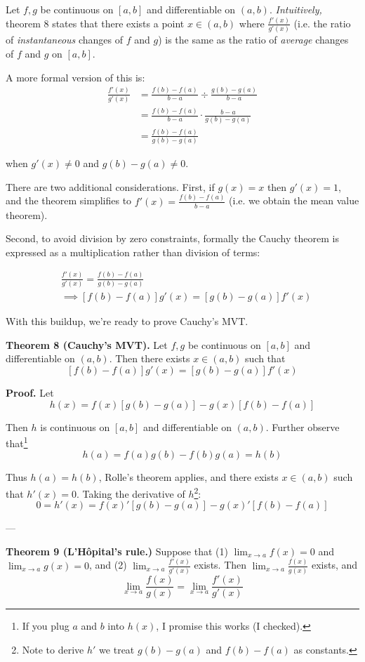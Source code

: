 \vs

Let $f,g$ be continuous on $[a,b]$ and differentiable on $(a,b)$.
\textit{Intuitively,} theorem 8 states that there exists a point
$x\in(a,b)$ where $\frac{f'(x)}{g'(x)}$ (i.e. the ratio of
\textit{instantaneous} changes of $f$ and $g$) is the same as the
ratio of \textit{average} changes of $f$ and $g$ on $[a,b]$.

\vs

A more formal version of this is:
\begin{align*}
  \frac{f'(x)}{g'(x)}&=\frac{f(b)-f(a)}{b-a}\div \frac{g(b)-g(a)}{b-a}\\
                     &=\frac{f(b)-f(a)}{b-a}\cdot \frac{b-a}{g(b)-g(a)}\\
                     &=\frac{f(b)-f(a)}{g(b)-g(a)}
\end{align*}

when $g'(x)\neq 0$ and $g(b)-g(a)\neq0$.

\vs

There are two additional considerations. First, if $g(x)=x$ then
$g'(x)=1$, and the theorem simplifies to $f'(x)=\frac{f(b)-f(a)}{b-a}$
(i.e. we obtain the mean value theorem).

\vs

Second, to avoid division by zero constraints, formally the Cauchy
theorem is expressed as a multiplication rather than division of
terms:

\begin{align*}
  &\frac{f'(x)}{g'(x)}=\frac{f(b)-f(a)}{g(b)-g(a)}\\
  &\implies [f(b)-f(a)]g'(x)=[g(b)-g(a)]f'(x)
\end{align*}

With this buildup, we're ready to prove Cauchy's MVT.

\vs

\textbf{Theorem 8 (Cauchy's MVT).} Let $f,g$ be continuous on $[a,b]$
and differentiable on $(a,b)$. Then there exists $x\in(a,b)$ such that
\[[f(b)-f(a)]g'(x)=[g(b)-g(a)]f'(x)\]

\vs

\textbf{Proof.} Let
\[h(x)=f(x)[g(b)-g(a)]-g(x)[f(b)-f(a)]\]

Then $h$ is continuous on $[a,b]$ and differentiable on $(a,b)$.
Further observe that\footnote{If you plug $a$ and $b$ into $h(x)$, I
  promise this works (I checked).}
\[h(a)=f(a)g(b)-f(b)g(a)=h(b)\]

Thus $h(a)=h(b)$, Rolle's theorem applies, and there exists
$x\in(a,b)$ such that $h'(x)=0$. Taking the derivative of
$h$\footnote{Note to derive $h'$ we treat $g(b)-g(a)$ and $f(b)-f(a)$
  as constants.}:
\[0=h'(x)=f(x)'[g(b)-g(a)]-g(x)'[f(b)-f(a)]\]

---\vs

\textbf{Theorem 9 (L'H\^opital's rule.)} Suppose that (1)
$\lim_{x\to a}f(x)=0$ and $\lim_{x\to a}g(x)=0$, and (2)
$\lim_{x\to a}\frac{f'(x)}{g'(x)}$ exists. Then
$\lim_{x\to a}\frac{f(x)}{g(x)}$ exists, and
\[\lim_{x\to a}\frac{f(x)}{g(x)}=\lim_{x\to a}\frac{f'(x)}{g'(x)}\]


